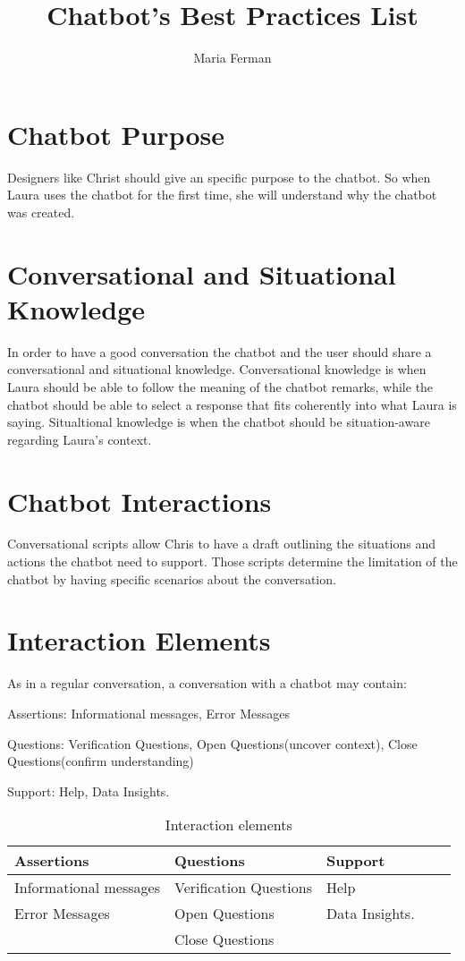 \documentclass[a4paper,10pt]{article}
\title{Chatbot's Best Practices List}
\author{Maria Ferman}
\begin{document}
\maketitle
\section{Chatbot Purpose}

Designers like Christ should give an specific purpose to the chatbot. So when Laura uses the chatbot for the first time, she will understand why the chatbot was created.

\section{Conversational and Situational Knowledge}

In order to have a good conversation the chatbot and the user should share a conversational and situational knowledge.  Conversational knowledge is when Laura should be able to follow the meaning of the chatbot remarks, while the chatbot should be able to select a response that fits coherently into what Laura is saying. Situaltional knowledge is when the chatbot should be situation-aware regarding Laura’s context.

\section{Chatbot Interactions}

Conversational scripts allow Chris to have a draft outlining the situations and actions the chatbot need to support. Those scripts determine the limitation of the chatbot by having specific scenarios about the conversation. 

\section{Interaction Elements}

As in a regular conversation, a conversation with a chatbot may contain:

Assertions: Informational messages, Error Messages

Questions: Verification Questions, Open Questions(uncover context), Close Questions(confirm understanding)

Support: Help, Data Insights.

\begin{table}[]
\centering

\label{InteractionElementsTable}
\begin{tabular}{lllll}
\hline
\textbf{Assertions}    & \textbf{Questions}     & \textbf{Support}   \\
\hline
Informational messages & Verification Questions & Help      \\
Error Messages         & Open Questions         & Data Insights.  \\
                       & Close Questions        &       \\
     \hline                   
\end{tabular}
\caption{Interaction elements}
\end{table}
\end{document}
